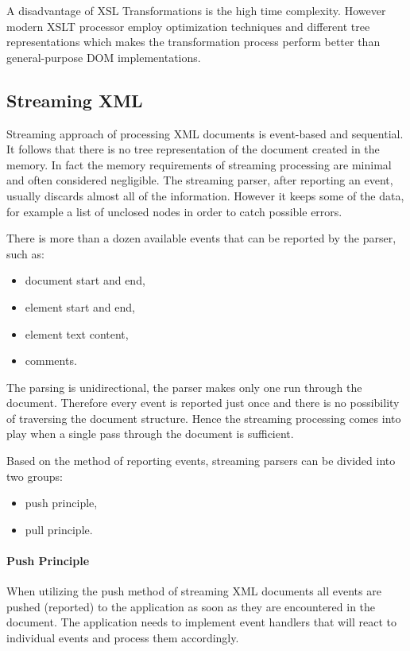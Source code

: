\documentclass[11pt,oneside,final]{fithesis2}
\begin{document}
A disadvantage of XSL Transformations is the high time complexity. However modern XSLT processor employ optimization techniques and different tree representations which makes the transformation process perform better than general-purpose DOM implementations.

\subsection{Streaming XML}
Streaming approach of processing XML documents is event-based and sequential. It follows that there is no tree representation of the document created in the memory. In fact the memory requirements of streaming processing are minimal and often considered negligible. The streaming parser, after reporting an event, usually discards almost all of the information. However it keeps some of the data, for example a list of unclosed nodes in order to catch possible errors. 

There is more than a dozen available events that can be reported by the parser, such as:
\begin{itemize}
\item document start and end,
\item element start and end,
\item element text content,
\item comments.  
\end{itemize}

The parsing is unidirectional, the parser makes only one run through the document. Therefore every event is reported just once and there is no possibility of traversing the document structure. Hence the streaming processing comes into play when a single pass through the document is sufficient.

Based on the method of reporting events, streaming parsers can be divided into two groups:
\begin{itemize}
\item push principle,
\item pull principle.
\end{itemize}

\paragraph*{Push Principle} When utilizing the push method of streaming XML documents all events are pushed (reported) to the application as soon as they are encountered in the document. The application needs to implement event handlers that will react to individual events and process them accordingly.
\end{document}
